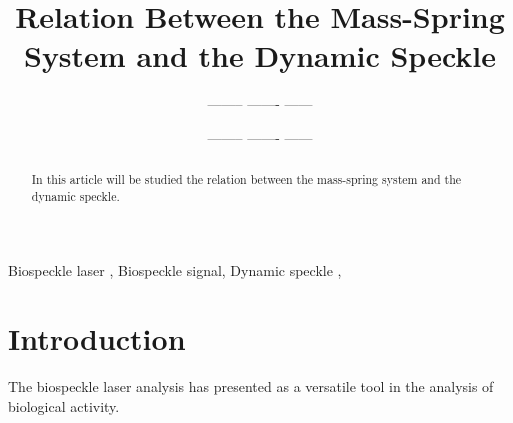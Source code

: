 \documentclass[review]{elsarticle}
\begin{document}
 

\begin{frontmatter}

\title{Relation Between the Mass-Spring System and the Dynamic Speckle}



\author{-------- ------- ------}
\author{-------- ------- ------}





\begin{abstract}
In this article will be studied the relation between the mass-spring system and the dynamic speckle.
\end{abstract}

\begin{keyword}
Biospeckle laser \sep 
Biospeckle signal\sep 
Dynamic speckle \sep  
\end{keyword}

\end{frontmatter}

\linenumbers

\section{Introduction}
The biospeckle laser analysis has presented as a versatile tool in the analysis of
biological activity. 

\end{document}

